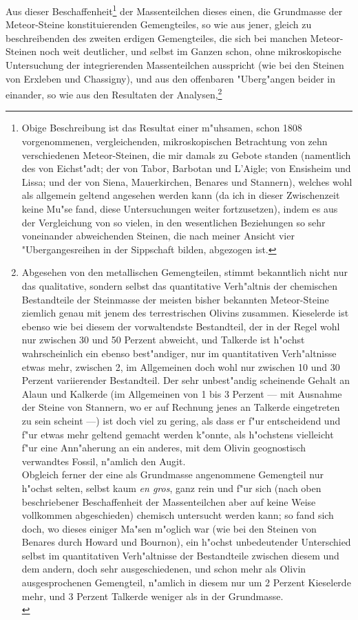 \documentclass[a4paper, 11pt, oneside, german]{article}
\begin{document}
Aus dieser Beschaffenheit\footnote{Obige Beschreibung ist das Resultat einer m"uhsamen, schon 1808 vorgenommenen, vergleichenden, mikroskopischen Betrachtung von zehn verschiedenen Meteor-Steinen, die mir damals zu Gebote standen (namentlich des von Eichst"adt; der von Tabor, Barbotan und L'Aigle; von Ensisheim und Lissa; und der von Siena, Mauerkirchen, Benares und Stannern), welches wohl als allgemein geltend angesehen werden kann (da ich in dieser Zwischenzeit keine Mu"se fand, diese Untersuchungen weiter fortzusetzen), indem es aus der Vergleichung von so vielen, in den wesentlichen Beziehungen so sehr voneinander abweichenden Steinen, die nach meiner Ansicht vier "Ubergangesreihen in der Sippschaft bilden, abgezogen ist.} der Massenteilchen dieses einen, die Grundmasse der Meteor-Steine konstituierenden Gemengteiles, so wie aus jener, gleich zu beschreibenden des zweiten erdigen Gemengteiles, die sich bei manchen Meteor-Steinen noch weit deutlicher, und selbst im Ganzen schon, ohne mikroskopische Untersuchung der integrierenden Massenteilchen ausspricht (wie bei den Steinen von Erxleben und Chassigny), und aus den offenbaren "Uberg"angen beider in einander, so wie aus den Resultaten der Analysen,\footnote{Abgesehen von den metallischen Gemengteilen, stimmt bekanntlich nicht nur das qualitative, sondern selbst das quantitative Verh"altnis der chemischen Bestandteile der Steinmasse der meisten bisher bekannten Meteor-Steine ziemlich genau mit jenem des terrestrischen Olivins zusammen. Kieselerde ist ebenso wie bei diesem der vorwaltendste Bestandteil, der in der Regel wohl nur zwischen 30 und 50 Perzent abweicht, und Talkerde ist h"ochst wahrscheinlich ein ebenso best"andiger, nur im quantitativen Verh"altnisse etwas mehr, zwischen 2, im Allgemeinen doch wohl nur zwischen 10 und 30 Perzent variierender Bestandteil. Der sehr unbest"andig scheinende Gehalt an Alaun und Kalkerde (im Allgemeinen von 1 bis 3 Perzent --- mit Ausnahme der Steine von Stannern, wo er auf Rechnung jenes an Talkerde eingetreten zu sein scheint ---) ist doch viel zu gering, als dass er f"ur entscheidend und f"ur etwas mehr geltend gemacht werden k"onnte, als h"ochstens vielleicht f"ur eine Ann"aherung an ein anderes, mit dem Olivin geognostisch verwandtes Fossil, n"amlich den Augit.\\
\hspace*{6mm}Obgleich ferner der eine als Grundmasse angenommene Gemengteil nur h"ochst selten, selbst kaum \emph{en gros}, ganz rein und f"ur sich (nach oben beschriebener Beschaffenheit der Massenteilchen aber auf keine Weise vollkommen abgeschieden) chemisch untersucht werden kann; so fand sich doch, wo dieses einiger Ma"sen m"oglich war (wie bei den Steinen von Benares durch Howard und Bournon), ein h"ochst unbedeutender Unterschied selbst im quantitativen Verh"altnisse der Bestandteile zwischen diesem und dem andern, doch sehr ausgeschiedenen, und schon mehr als Olivin ausgesprochenen Gemengteil, n"amlich in diesem nur um 2 Perzent Kieselerde mehr, und 3 Perzent Talkerde weniger als in der Grundmasse.\\
}
\end{document}
